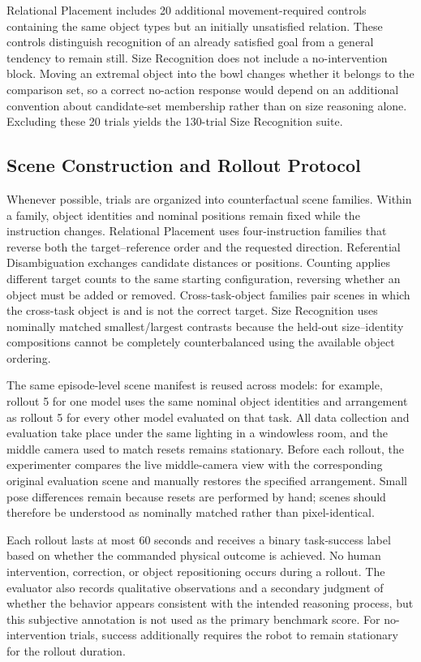 Relational Placement includes 20 additional movement-required controls containing the same object types but an initially unsatisfied relation. These controls distinguish recognition of an already satisfied goal from a general tendency to remain still. Size Recognition does not include a no-intervention block. Moving an extremal object into the bowl changes whether it belongs to the comparison set, so a correct no-action response would depend on an additional convention about candidate-set membership rather than on size reasoning alone. Excluding these 20 trials yields the 130-trial Size Recognition suite.

\subsection{Scene Construction and Rollout Protocol}

Whenever possible, trials are organized into counterfactual scene families. Within a family, object identities and nominal positions remain fixed while the instruction changes. Relational Placement uses four-instruction families that reverse both the target--reference order and the requested direction. Referential Disambiguation exchanges candidate distances or positions. Counting applies different target counts to the same starting configuration, reversing whether an object must be added or removed. Cross-task-object families pair scenes in which the cross-task object is and is not the correct target. Size Recognition uses nominally matched smallest/largest contrasts because the held-out size--identity compositions cannot be completely counterbalanced using the available object ordering.

The same episode-level scene manifest is reused across models: for example, rollout 5 for one model uses the same nominal object identities and arrangement as rollout 5 for every other model evaluated on that task. All data collection and evaluation take place under the same lighting in a windowless room, and the middle camera used to match resets remains stationary. Before each rollout, the experimenter compares the live middle-camera view with the corresponding original evaluation scene and manually restores the specified arrangement. Small pose differences remain because resets are performed by hand; scenes should therefore be understood as nominally matched rather than pixel-identical.

Each rollout lasts at most 60 seconds and receives a binary task-success label based on whether the commanded physical outcome is achieved. No human intervention, correction, or object repositioning occurs during a rollout. The evaluator also records qualitative observations and a secondary judgment of whether the behavior appears consistent with the intended reasoning process, but this subjective annotation is not used as the primary benchmark score. For no-intervention trials, success additionally requires the robot to remain stationary for the rollout duration.
